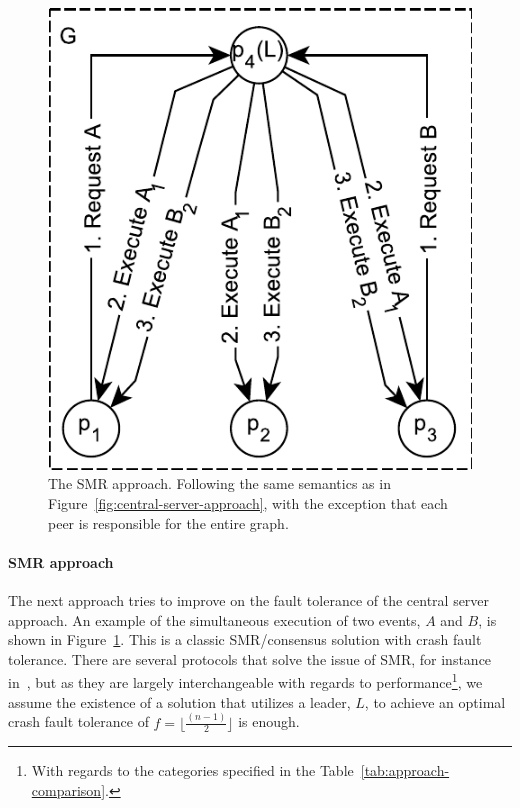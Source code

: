 \documentclass{article}
\begin{document}
    \FloatBarrier
    \begin{figure}[ht!]
        \center
        \includegraphics[scale=0.7]{figures/dcr-graphs/smr-approach.pdf}
        \caption{The SMR approach.
        Following the same semantics as in Figure~\ref{fig:central-server-approach}, with the exception that each peer is responsible for the entire graph.}
        \label{fig:smr-approach}
    \end{figure}
    \FloatBarrier

	\paragraph{SMR approach}
	The next approach tries to improve on the fault tolerance of the central server approach.
    An example of the simultaneous execution of two events, $A$ and $B$, is shown in Figure~\ref{fig:smr-approach}.
	This is a classic SMR/consensus solution with crash fault tolerance.
	There are several protocols that solve the issue of SMR, for instance in~\cite{bracha_asynchronous_1985,lamport_part-time_1998,lamport_lower_2006,ongaro_search_2014}, but as they are largely interchangeable with regards to performance\footnote{With regards to the categories specified in the Table~\ref{tab:approach-comparison}.}, we assume the existence of a solution that utilizes a leader, $L$, to achieve an optimal crash fault tolerance of $f = \lfloor \frac{(n-1)}{2} \rfloor$ is enough.
\end{document}
